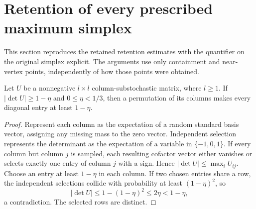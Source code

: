 \section{Retention of every prescribed maximum simplex}
\label{sec:retention}
This section reproduces the retained retention estimates with the quantifier
on the original simplex explicit. The arguments use only containment and
near-vertex points, independently of how those points were obtained.

\begin{lemma}\label{lem:matching}
Let $U$ be a nonnegative $l\times l$ column-substochastic matrix, where
$l\ge1$. If $|\det U|\ge1-\eta$ and $0\le\eta<1/3$, then a permutation
of its columns makes every diagonal entry at least $1-\eta$.
\end{lemma}
\begin{proof}
Represent each column as the expectation of a random standard basis
vector, assigning any missing mass to the zero vector. Independent
selection represents the determinant as the expectation of a variable in
$\{-1,0,1\}$. If every column but column $j$ is sampled, each resulting
cofactor vector either vanishes or selects exactly one entry of column $j$
with a sign. Hence $|\det U|\le\max_iU_{ij}$. Choose an entry at least
$1-\eta$ in each column. If two chosen entries share a row, the independent
selections collide with probability at least $(1-\eta)^2$, so
\[
 |\det U|\le1-(1-\eta)^2\le2\eta<1-\eta,
\]
a contradiction. The selected rows are distinct.
\end{proof}

